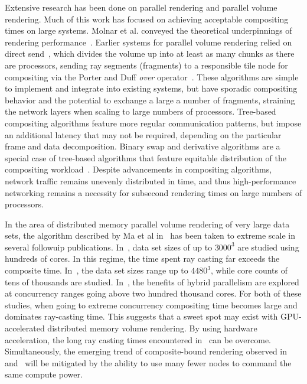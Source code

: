 Extensive research has been done on parallel rendering and parallel
volume rendering.  Much of this work has focused on achieving
acceptable compositing times on large systems.  Molnar et al. conveyed
the theoretical underpinnings of rendering
performance~\cite{Molnar:199?:???}.  Earlier systems for parallel
volume rendering relied on direct send~\cite{Hsu:1993:???,
Ma:1993:???}, which divides the volume up into at least as many
chunks as there are processors, sending ray segments (fragments) to a
responsible tile node for compositing via the Porter and Duff
\emph{over} operator~\cite{PorterDuff:1984:Compositing}.  These
algorithms are simple to implement and integrate into existing systems,
but have sporadic compositing behavior and the potential to exchange a
large a number of fragments, straining the network layers when scaling
to large numbers of processors.  Tree-based compositing algorithms
feature more regular communication patterns, but impose an additional
latency that may not be required, depending on the particular frame
and data decomposition.  Binary swap and derivative algorithms are a
special case of tree-based algorithms that feature
equitable distribution of the compositing workload~\cite{Ma:1994:???}.
Despite advancements in compositing algorithms, network traffic remains
unevenly distributed in time, and thus high-performance networking
remains a necessity for subsecond rendering times on large numbers of
processors.

In the area of distributed memory parallel volume rendering of very
large data sets, the algorithm described by Ma et al
in~\cite{Ma:1993:???} has been taken to extreme scale in several
followuip publications.  In~\cite{Childs:2006:???}, data set sizes of
up to $3000^3$ are studied using hundreds of cores.  In this regime,
the time spent ray casting far exceeds the composite time.
In~\cite{PYRM:2008:???, PYR:2009:???}, the data set sizes range up to
$4480^3$, while core counts of tens of thousands are studied.
In~\cite{HBC:2010:???}, the benefits of hybrid parallelism are explored
at concurrency ranges going above two hundred thousand cores.  For both
of these studies, when going to extreme concurrency compositing time
becomes large and dominates ray-casting time.  This suggests that a
sweet spot may exist with GPU-accelerated distributed memory volume
rendering.  By using hardware acceleration, the long ray
casting times encountered in~\cite{Childs:2006:???} can be overcome.
Simultaneously, the emerging trend of composite-bound rendering
observed in~\cite{PYR:2009:???} and~\cite{HBC:2010:???} will be
mitigated by the ability to use many fewer nodes to command the same
compute power.

